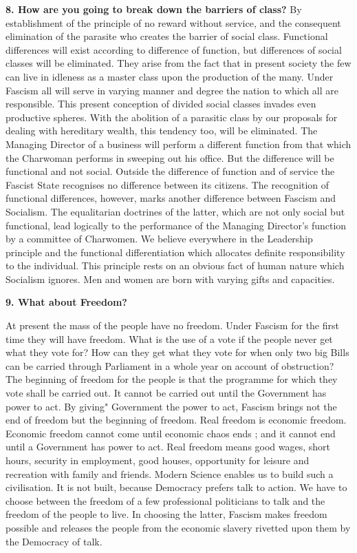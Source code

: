 \documentclass{book}
\begin{document}
\begin{flushleft}
\textbf{8. How are you going to break down the barriers of class?}
By establishment of the principle of no reward without service, and the consequent elimination
of the parasite who creates the barrier of social class. Functional differences will exist according
to difference of function, but differences of social classes will be eliminated. They arise from the
fact that in present society the few can live in idleness as a master class upon the production of
the many. Under Fascism all will serve in varying manner and degree the nation to which all are
responsible.
This present conception of divided social classes invades even productive spheres. With the
abolition of a parasitic class by our proposals for dealing with hereditary wealth, this tendency
too, will be eliminated. The Managing Director of a business will perform a different function
from that which the Charwoman performs in sweeping out his office. But the difference will be
functional and not social. Outside the difference of function and of service the Fascist State
recognises no difference between its citizens. The recognition of functional differences, however,
marks another difference between Fascism and Socialism. The equalitarian doctrines of the latter,
which are not only social but functional, lead logically to the performance of the Managing
Director's function by a committee of Charwomen.
We believe everywhere in the Leadership principle and the functional differentiation which
allocates definite responsibility to the individual. This principle rests on an obvious fact of
human nature which Socialism ignores. Men and women are born with varying gifts and
capacities.
\end{flushleft}
\begin{flushright}
\textbf{9. What about Freedom?}

At present the mass of the people have no freedom. Under Fascism for the first time they will
have freedom. What is the use of a vote if the people never get what they vote for? How can
they get what they vote for when only two big Bills can be carried through Parliament in a whole
year on account of obstruction? The beginning of freedom for the people is that the programme
for which they vote shall be carried out. It cannot be carried out until the Government has power
to act. By giving" Government the power to act, Fascism brings not the end of freedom but the
beginning of freedom. Real freedom is economic freedom. Economic freedom cannot come until
economic chaos ends ; and it cannot end until a Government has power to act.
Real freedom means good wages, short hours, security in employment, good houses, opportunity
for leisure and recreation with family and friends. Modern Science enables us to build such a
civilisation. It is not built, because Democracy prefers talk to action. We have to choose between
the freedom of a few professional politicians to talk and the freedom of the people to live. In
choosing the latter, Fascism makes freedom possible and releases the people from the economic slavery rivetted upon them by the
Democracy of talk.
\end{flushright}
\end{document}
